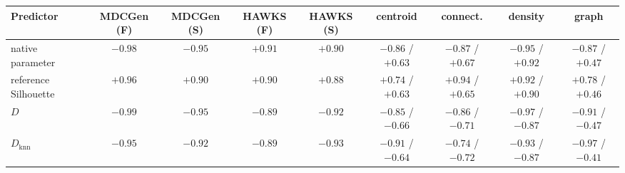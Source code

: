 \begin{tabular}{@{}lcccccccc@{}}
\toprule
Predictor & MDCGen (F) & MDCGen (S) & HAWKS (F) & HAWKS (S) & centroid & connect. & density & graph \\
\midrule
native parameter & $-0.98$ & $-0.95$ & $+0.91$ & $+0.90$ & $-0.86$ / $+0.63$ & $-0.87$ / $+0.67$ & $-0.95$ / $+0.92$ & $-0.87$ / $+0.47$ \\
reference Silhouette & $+0.96$ & $+0.90$ & $+0.90$ & $+0.88$ & $+0.74$ / $+0.63$ & $+0.94$ / $+0.65$ & $+0.92$ / $+0.90$ & $+0.78$ / $+0.46$ \\
$D$ & $-0.99$ & $-0.95$ & $-0.89$ & $-0.92$ & $-0.85$ / $-0.66$ & $-0.86$ / $-0.71$ & $-0.97$ / $-0.87$ & $-0.91$ / $-0.47$ \\
$D_{\text{knn}}$ & $-0.95$ & $-0.92$ & $-0.89$ & $-0.93$ & $-0.91$ / $-0.64$ & $-0.74$ / $-0.72$ & $-0.93$ / $-0.87$ & $-0.97$ / $-0.41$ \\
\bottomrule
\end{tabular}
